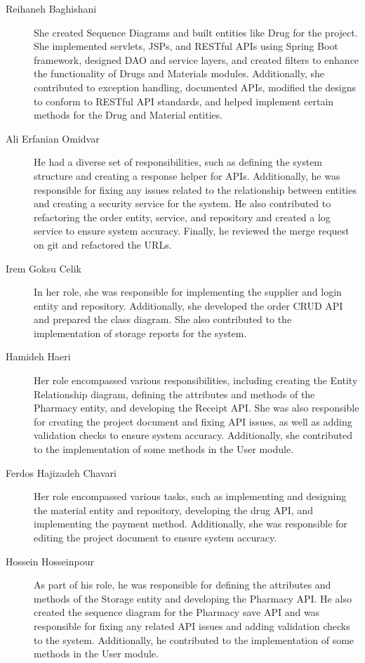 \begin{description}
	\item[Reihaneh Baghishani] She created Sequence Diagrams and built entities like Drug for the project. She implemented servlets, JSPs, and RESTful APIs using Spring Boot framework, designed DAO and service layers, and created filters to enhance the functionality of Drugs and Materials modules. Additionally, she contributed to exception handling, documented APIs, modified the designs to conform to RESTful API standards, and helped implement certain methods for the Drug and Material entities.

	\item[Ali Erfanian Omidvar] He had a diverse set of responsibilities, such as defining the system structure and creating a response helper for APIs. Additionally, he was responsible for fixing any issues related to the relationship between entities and creating a security service for the system. He also contributed to refactoring the order entity, service, and repository and created a log service to ensure system accuracy. Finally, he reviewed the merge request on git and refactored the URLs.
 
	\item[Irem Goksu Celik] In her role, she was responsible for implementing the supplier and login entity and repository. Additionally, she developed the order CRUD API and prepared the class diagram. She also contributed to the implementation of storage reports for the system.
 
	\item[Hamideh Haeri] Her role encompassed various responsibilities, including creating the Entity Relationship diagram, defining the attributes and methods of the Pharmacy entity, and developing the Receipt API. She was also responsible for creating the project document and fixing API issues, as well as adding validation checks to ensure system accuracy. Additionally, she contributed to the implementation of some methods in the User module.
 
	\item[Ferdos Hajizadeh Chavari] Her role encompassed various tasks, such as implementing and designing the material entity and repository, developing the drug API, and implementing the payment method. Additionally, she was responsible for editing the project document to ensure system accuracy.
 
	\item[Hossein Hosseinpour] As part of his role, he was responsible for defining the attributes and methods of the Storage entity and developing the Pharmacy API. He also created the sequence diagram for the Pharmacy save API and was responsible for fixing any related API issues and adding validation checks to the system. Additionally, he contributed to the implementation of some methods in the User module.


\end{description}
